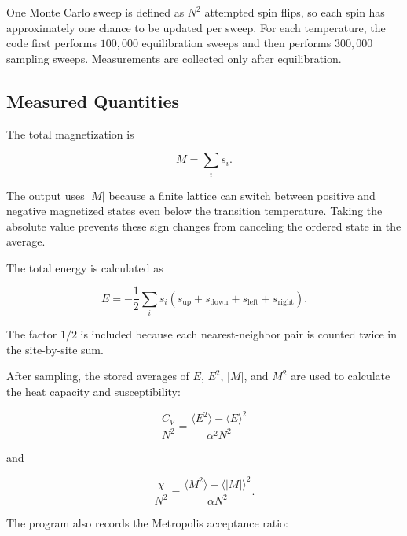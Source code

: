 \documentclass[11pt]{article}
\let\oldsubsection\subsection
\renewcommand{\subsection}[1]{\Needspace{2\baselineskip}\oldsubsection{#1}}
\begin{document}
One Monte Carlo sweep is defined as $N^2$ attempted spin flips, so each spin has approximately one chance to be updated per sweep. For each temperature, the code first performs $100{,}000$ equilibration sweeps and then performs $300{,}000$ sampling sweeps. Measurements are collected only after equilibration.

\subsection{Measured Quantities}

The total magnetization is

\medskip

\begin{equation}
M=\sum_i s_i.
\end{equation}

\medskip
The output uses $|M|$ because a finite lattice can switch between positive and negative magnetized states even below the transition temperature. Taking the absolute value prevents these sign changes from canceling the ordered state in the average.

The total energy is calculated as

\medskip

\begin{equation}
E=-\frac{1}{2}\sum_i s_i
\left(s_{\mathrm{up}}+s_{\mathrm{down}}+s_{\mathrm{left}}+s_{\mathrm{right}}\right).
\end{equation}

\medskip
The factor $1/2$ is included because each nearest-neighbor pair is counted twice in the site-by-site sum.

After sampling, the stored averages of $E$, $E^2$, $|M|$, and $M^2$ are used to calculate the heat capacity and susceptibility:

\medskip

\begin{equation}
\frac{C_V}{N^2}
=
\frac{\langle E^2\rangle-\langle E\rangle^2}
{\alpha^2N^2}
\end{equation}

\medskip
and

\medskip

\begin{equation}
\frac{\chi}{N^2}
=
\frac{\langle M^2\rangle-\langle |M|\rangle^2}
{\alpha N^2}.
\end{equation}

\medskip
The program also records the Metropolis acceptance ratio:
\end{document}
